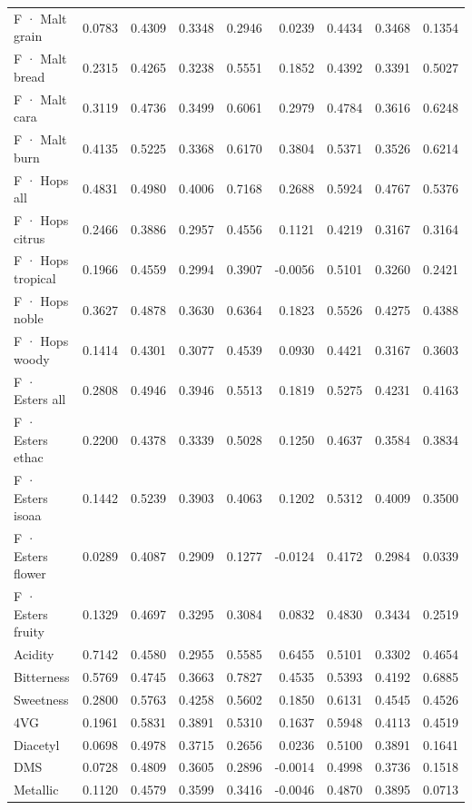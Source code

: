 {\begin{longtable}{lrrrrrrrr}
F · Malt grain & 0.0783 & 0.4309 & 0.3348 & 0.2946 & 0.0239 & 0.4434 & 0.3468 & 0.1354 \\
F · Malt bread & 0.2315 & 0.4265 & 0.3238 & 0.5551 & 0.1852 & 0.4392 & 0.3391 & 0.5027 \\
F · Malt cara & 0.3119 & 0.4736 & 0.3499 & 0.6061 & 0.2979 & 0.4784 & 0.3616 & 0.6248 \\
F · Malt burn & 0.4135 & 0.5225 & 0.3368 & 0.6170 & 0.3804 & 0.5371 & 0.3526 & 0.6214 \\
F · Hops all & 0.4831 & 0.4980 & 0.4006 & 0.7168 & 0.2688 & 0.5924 & 0.4767 & 0.5376 \\
F · Hops citrus & 0.2466 & 0.3886 & 0.2957 & 0.4556 & 0.1121 & 0.4219 & 0.3167 & 0.3164 \\
F · Hops tropical & 0.1966 & 0.4559 & 0.2994 & 0.3907 & -0.0056 & 0.5101 & 0.3260 & 0.2421 \\
F · Hops noble & 0.3627 & 0.4878 & 0.3630 & 0.6364 & 0.1823 & 0.5526 & 0.4275 & 0.4388 \\
F · Hops woody & 0.1414 & 0.4301 & 0.3077 & 0.4539 & 0.0930 & 0.4421 & 0.3167 & 0.3603 \\
F · Esters all & 0.2808 & 0.4946 & 0.3946 & 0.5513 & 0.1819 & 0.5275 & 0.4231 & 0.4163 \\
F · Esters ethac & 0.2200 & 0.4378 & 0.3339 & 0.5028 & 0.1250 & 0.4637 & 0.3584 & 0.3834 \\
F · Esters isoaa & 0.1442 & 0.5239 & 0.3903 & 0.4063 & 0.1202 & 0.5312 & 0.4009 & 0.3500 \\
F · Esters flower & 0.0289 & 0.4087 & 0.2909 & 0.1277 & -0.0124 & 0.4172 & 0.2984 & 0.0339 \\
F · Esters fruity & 0.1329 & 0.4697 & 0.3295 & 0.3084 & 0.0832 & 0.4830 & 0.3434 & 0.2519 \\
Acidity & 0.7142 & 0.4580 & 0.2955 & 0.5585 & 0.6455 & 0.5101 & 0.3302 & 0.4654 \\
Bitterness & 0.5769 & 0.4745 & 0.3663 & 0.7827 & 0.4535 & 0.5393 & 0.4192 & 0.6885 \\
Sweetness & 0.2800 & 0.5763 & 0.4258 & 0.5602 & 0.1850 & 0.6131 & 0.4545 & 0.4526 \\
4VG & 0.1961 & 0.5831 & 0.3891 & 0.5310 & 0.1637 & 0.5948 & 0.4113 & 0.4519 \\
Diacetyl & 0.0698 & 0.4978 & 0.3715 & 0.2656 & 0.0236 & 0.5100 & 0.3891 & 0.1641 \\
DMS & 0.0728 & 0.4809 & 0.3605 & 0.2896 & -0.0014 & 0.4998 & 0.3736 & 0.1518 \\
Metallic & 0.1120 & 0.4579 & 0.3599 & 0.3416 & -0.0046 & 0.4870 & 0.3895 & 0.0713 \\

\end{longtable}}
